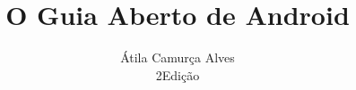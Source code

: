 \documentclass[a4paper,11pt]{book}
\title{O Guia Aberto de Android}
\author{Átila Camurça Alves\\2\degree Edição}
\begin{document}
\maketitle
\tableofcontents
\listoflistings











\printglossary
\end{document}
